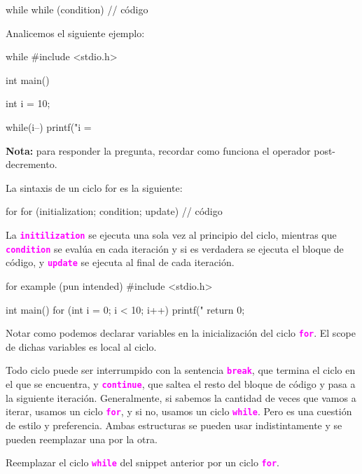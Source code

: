 \documentclass[]{scrartcl}
\newcommand{\hl}[1]{\textcolor{magenta}{\textbf{\texttt{#1}}}}
\begin{document}
\begin{cbox}[]{while}
  while (condition) {
    // código
  }
\end{cbox}

Analicemos el siguiente ejemplo:

\begin{cbox}[]{while}
  #include <stdio.h>

  int main() {
    int i = 10;
  
    while(i--){
      printf("i = %
    }
  }

\end{cbox}

\begin{notebox}
  \textbf{Nota:} para responder la pregunta, recordar como funciona el operador post-decremento.
\end{notebox}

La sintaxis de un ciclo for es la siguiente:

\begin{cbox}[]{for}
  for (initialization; condition; update) {
    // código
  }
\end{cbox}

La \hl{initilization} se ejecuta una sola vez al principio del ciclo, mientras que \hl{condition} se evalúa en cada iteración y si es verdadera se ejecuta el bloque de código, y \hl{update} se ejecuta al final de cada iteración.

\begin{cbox}[]{for example (pun intended)}
  #include <stdio.h>
  
  int main() {
    for (int i = 0; i < 10; i++) {
      printf("%
    }
    return 0;
  }
\end{cbox}

Notar como podemos declarar variables en la inicialización del ciclo \hl{for}. El scope de dichas variables es local al ciclo.

Todo ciclo puede ser interrumpido con la sentencia \hl{break}, que termina el ciclo en el que se encuentra, y \hl{continue}, que saltea el resto del bloque de código y pasa a la siguiente iteración.
Generalmente, si sabemos la cantidad de veces que vamos a iterar, usamos un ciclo \hl{for}, y si no, usamos un ciclo \hl{while}. Pero es una cuestión de estilo y preferencia. Ambas estructuras se pueden usar indistintamente y se pueden reemplazar una por la otra.

\begin{exbox}[]
  Reemplazar el ciclo \hl{while} del snippet anterior por un ciclo \hl{for}.
\end{exbox}
 
\end{document}
